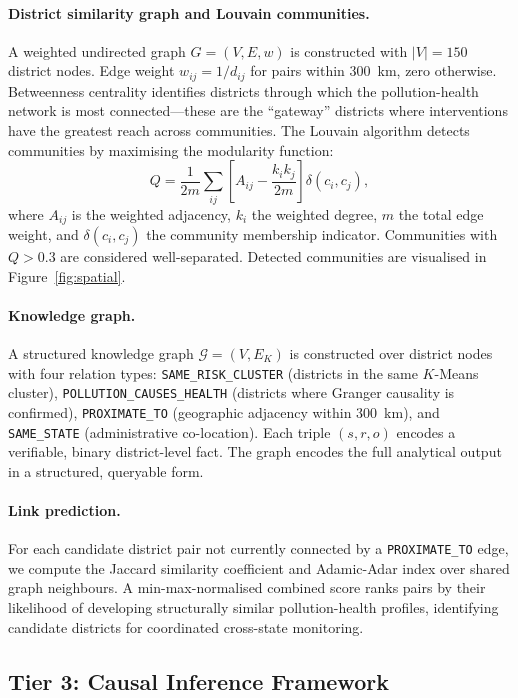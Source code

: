 \documentclass{article}
\begin{document}
\paragraph{District similarity graph and Louvain communities.}
A weighted undirected graph $G = (V, E, w)$ is constructed with $|V| = 150$ district
nodes. Edge weight $w_{ij} = 1/d_{ij}$ for pairs within 300~km, zero otherwise.
Betweenness centrality identifies districts through which the pollution-health network
is most connected---these are the ``gateway'' districts where interventions have the
greatest reach across communities. The Louvain algorithm \cite{blondel2008} detects
communities by maximising the modularity function:
\[
  Q = \frac{1}{2m} \sum_{ij} \left[ A_{ij} - \frac{k_i k_j}{2m} \right]
      \delta(c_i, c_j),
\]
where $A_{ij}$ is the weighted adjacency, $k_i$ the weighted degree, $m$ the total
edge weight, and $\delta(c_i, c_j)$ the community membership indicator. Communities
with $Q > 0.3$ are considered well-separated. Detected communities are visualised in
Figure~\ref{fig:spatial}.

\paragraph{Knowledge graph.}
A structured knowledge graph $\mathcal{G} = (V, E_K)$ is constructed over district
nodes with four relation types: \texttt{SAME\_RISK\_CLUSTER} (districts in the same
$K$-Means cluster), \texttt{POLLUTION\_CAUSES\_HEALTH} (districts where Granger causality
is confirmed), \texttt{PROXIMATE\_TO} (geographic adjacency within 300~km), and
\texttt{SAME\_STATE} (administrative co-location). Each triple $(s, r, o)$ encodes a
verifiable, binary district-level fact. The graph encodes the full analytical output in
a structured, queryable form.

\paragraph{Link prediction.}
For each candidate district pair not currently connected by a \texttt{PROXIMATE\_TO} edge,
we compute the Jaccard similarity coefficient and Adamic-Adar index over shared graph
neighbours. A min-max-normalised combined score ranks pairs by their likelihood of
developing structurally similar pollution-health profiles, identifying candidate districts
for coordinated cross-state monitoring.

\subsection{Tier 3: Causal Inference Framework}
\end{document}

